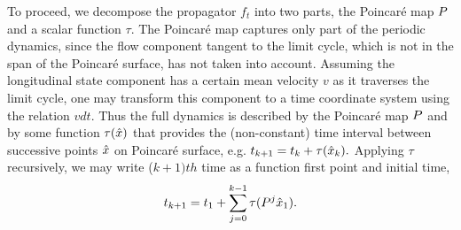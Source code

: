 To proceed, we decompose the propagator $f_t$ into two parts, the
Poincar\'e map $P$ and a scalar function $\tau$.  The Poincar\'e map
captures only part of the periodic dynamics, since the flow component
tangent to the limit cycle, which is not in the span of the
Poincar\'e surface, has not  taken into account.
Assuming the longitudinal state component has a certain mean velocity
$v$ as it traverses the limit cycle, one may transform this component
to a time coordinate system using the relation $v dt$.  Thus the full
dynamics is described by the Poincar\'e map $P$ and by some function
$\tau(\hat{x})$  that provides the (non-constant) time interval between
successive points $\hat{x}$ on Poincar\'e surface, e.g. $t_{k+1}  = t_k
+ \tau(\hat{x}_k).$
%
%
Applying $\tau$ recursively, we may write ($k+1)th$ time as a
function first point and initial time,
%
\begin{eqnarray}
 t_{k+1}  = t _1+ \sum_{j=0}^{k-1}\tau(P^j\hat{x}_1).
 \label{eq:poirec2}
\end{eqnarray}
%
%

